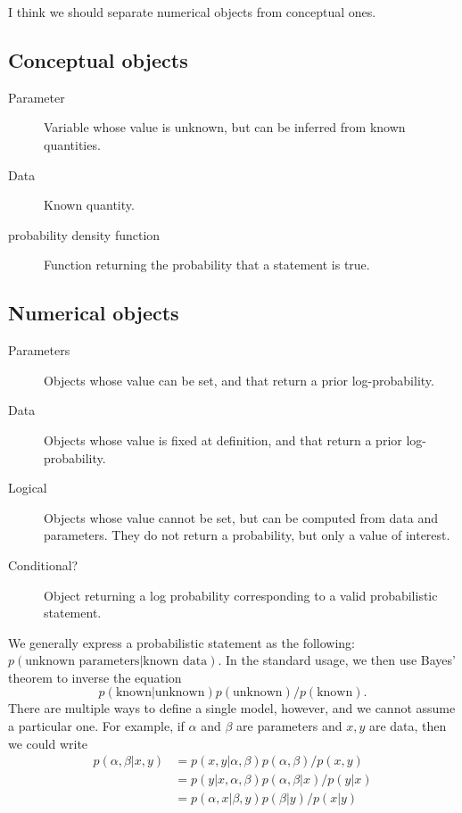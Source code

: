 \documentclass{article}
\begin{document}
I think we should separate numerical objects from conceptual ones.

\subsection{Conceptual objects}
\begin{description}
\item[Parameter] Variable whose value is unknown, but can be inferred from known quantities.
\item[Data] Known quantity.
\item[probability density function] Function returning the probability that a statement is true.
\end{description}

\subsection{Numerical objects}
\begin{description}
\item[Parameters] Objects whose value can be set, and that return a prior log-probability.
\item[Data] Objects whose value is fixed at definition, and that return a prior log-probability.
\item[Logical] Objects whose value cannot be set, but can be computed from data and parameters. They do not return a probability, but only a value of interest.
\item[Conditional?] Object returning a log probability corresponding to a valid probabilistic statement.
\end{description}

We generally express a probabilistic statement as the following:
$p(\textrm{unknown parameters}| \textrm{known data})$. In the standard usage, we then use Bayes' theorem to inverse the equation
$$p(\textrm{known}| \textrm{unknown})p(\textrm{unknown} )/p(\textrm{known} ).$$ There are multiple ways to define a single model, however, and we cannot assume  a particular one. For example, if $\alpha$ and $\beta$ are parameters and $x,y $ are data, then we could write
\begin{align}
p(\alpha, \beta|x,y) & = p(x,y|\alpha , \beta)p(\alpha,\beta)/p(x,y)\\
& =p(y|x,\alpha,\beta)p(\alpha,\beta|x)/p(y|x )\\
& = p(\alpha, x|\beta ,y)p(\beta|y)/p(x|y)
\end{align}
\end{document}
